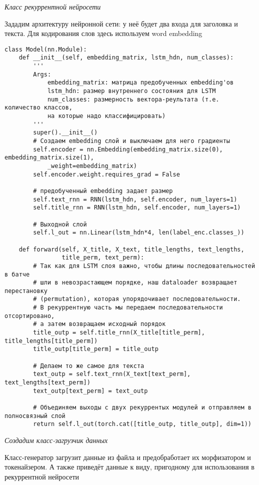 \textit{Класс рекуррентной нейросети}

Зададим архитектуру нейронной сети: у неё будет два входа для заголовка и текста. Для кодирования слов здесь используем word embedding

\begin{verbatim}
class Model(nn.Module):
    def __init__(self, embedding_matrix, lstm_hdn, num_classes):
        '''
        Args:
            embedding_matrix: матрица предобученных embedding'ов
            lstm_hdn: размер внутреннего состояния для LSTM
            num_classes: размерность вектора-реультата (т.е. количество классов, 
            на которые надо классифицировать)
        '''
        super().__init__()
        # Создаем embedding слой и выключаем для него градиенты
        self.encoder = nn.Embedding(embedding_matrix.size(0), embedding_matrix.size(1),
            _weight=embedding_matrix)
        self.encoder.weight.requires_grad = False
        
        # предобученный embedding задает размер 
        self.text_rnn = RNN(lstm_hdn, self.encoder, num_layers=1)
        self.title_rnn = RNN(lstm_hdn, self.encoder, num_layers=1)
        
        # Выходной слой
        self.l_out = nn.Linear(lstm_hdn*4, len(label_enc.classes_))
        
    def forward(self, X_title, X_text, title_lengths, text_lengths, 
                title_perm, text_perm):
        # Так как для LSTM слоя важно, чтобы длины последовательностей в батче 
        # шли в невозрастающем порядке, наш dataloader возвращает перестановку 
        # (permutation), которая упорядочивает последовательности.
        # В рекуррентную часть мы передаем последовательности отсортировано, 
        # а затем возвращаем исходный порядок
        title_outp = self.title_rnn(X_title[title_perm], title_lengths[title_perm])
        title_outp[title_perm] = title_outp
        
        # Делаем то же самое для текста
        text_outp = self.text_rnn(X_text[text_perm], text_lengths[text_perm])
        text_outp[text_perm] = text_outp
        
        # Объединяем выходы с двух рекуррентых модулей и отправляем в полносвязный слой
        return self.l_out(torch.cat([title_outp, title_outp], dim=1))
\end{verbatim}

\textit{Создадим класс-загрузчик данных}

Класс-генератор загрузит данные из файла и предобработает их морфизатором и токенайзером. А также приведёт данные к виду, пригодному для использования в рекуррентной нейросети


